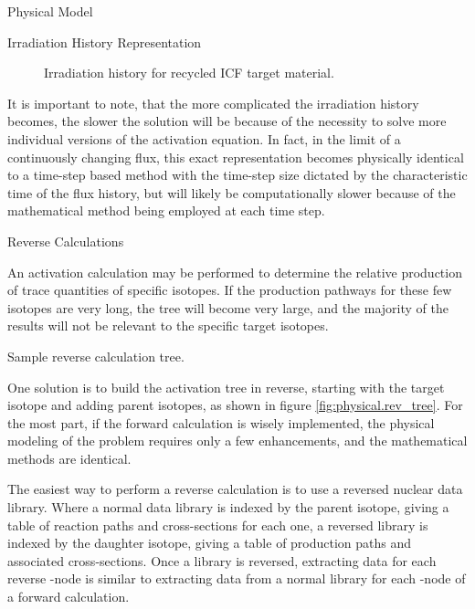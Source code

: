 \begin{chapter}{Physical Model\label{chap:physical}}
\begin{section}{Irradiation History Representation\label{sec:physical.pulsing}}
  \enlargethispage*{\baselineskip}

  \begin{figure}[htbp]
    \begin{center}
      \leavevmode
      \caption{Irradiation history for recycled ICF target material.}
      \label{fig:physical.highZ_recycle_hist}
    \end{center}
  \end{figure}
  
  It is important to note, that the more complicated the irradiation
  history becomes, the slower the solution will be because of the
  necessity to solve more individual versions of the activation
  equation.  In fact, in the limit of a continuously changing flux,
  this exact representation becomes physically identical to a
  time-step based method with the time-step size dictated by the
  characteristic time of the flux history, but will likely be
  computationally slower because of the mathematical method being
  employed at each time step.
\end{section}


\begin{section}{Reverse Calculations\label{sec:physical.reverse}}
  
  An activation calculation may be performed to determine the relative
  production of trace quantities of specific isotopes.  If the
  production pathways for these few isotopes are very long, the tree
  will become very large, and the majority of the results will not be
  relevant to the specific target isotopes.
  
  \begin{floatingfigure}{0.55\columnwidth}
    \begin{center}
      \caption{Sample reverse calculation tree.}\label{fig:physical.rev_tree}
    \end{center}
  \end{floatingfigure}

  One solution is to build the activation tree in reverse, starting
  with the target isotope and adding parent isotopes, as shown in
  figure \ref{fig:physical.rev_tree}.  For the most part, if the
  forward calculation is wisely implemented, the physical modeling of
  the problem requires only a few enhancements, and the mathematical
  methods are identical.
  
  The easiest way to perform a reverse calculation is to use a
  reversed nuclear data library.  Where a normal data library is
  indexed by the parent isotope, giving a table of reaction paths and
  cross-sections for each one, a reversed library is indexed by the
  daughter isotope, giving a table of production paths and associated
  cross-sections.  Once a library is reversed, extracting data for
  each reverse \pc-node is similar to extracting data from a normal
  library for each \pc-node of a forward calculation.
  

\end{section}
\end{chapter}
